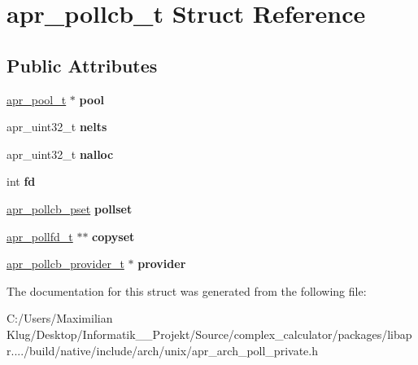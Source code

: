 \hypertarget{structapr__pollcb__t}{}\section{apr\+\_\+pollcb\+\_\+t Struct Reference}
\label{structapr__pollcb__t}
\subsection*{Public Attributes}
\begin{DoxyCompactItemize}
\item 
\mbox{\label{structapr__pollcb__t_a6d9b05e3797933c5e537312fe772b6a8}} 
\mbox{\hyperlink{group__apr__pools_gaf137f28edcf9a086cd6bc36c20d7cdfb}{apr\+\_\+pool\+\_\+t}} $\ast$ {\bfseries pool}
\item 
\mbox{\label{structapr__pollcb__t_ab6ba300bcd03fb92a16163b866bd5b5e}} 
apr\+\_\+uint32\+\_\+t {\bfseries nelts}
\item 
\mbox{\label{structapr__pollcb__t_a6b43d3034680d3227eadad8569837c2e}} 
apr\+\_\+uint32\+\_\+t {\bfseries nalloc}
\item 
\mbox{\label{structapr__pollcb__t_a109b84513925368dd7f1b1fb1653c198}} 
int {\bfseries fd}
\item 
\mbox{\label{structapr__pollcb__t_a4334b3d1e7a4b9acbb633d3575ae389d}} 
\mbox{\hyperlink{unionapr__pollcb__pset}{apr\+\_\+pollcb\+\_\+pset}} {\bfseries pollset}
\item 
\mbox{\label{structapr__pollcb__t_ae057ae42284f10a37470369b36815e06}} 
\mbox{\hyperlink{structapr__pollfd__t}{apr\+\_\+pollfd\+\_\+t}} $\ast$$\ast$ {\bfseries copyset}
\item 
\mbox{\label{structapr__pollcb__t_abf254cccefa7e8cf4b3503c90265fd3d}} 
\mbox{\hyperlink{structapr__pollcb__provider__t}{apr\+\_\+pollcb\+\_\+provider\+\_\+t}} $\ast$ {\bfseries provider}
\end{DoxyCompactItemize}


The documentation for this struct was generated from the following file\+:\begin{DoxyCompactItemize}
\item 
C\+:/\+Users/\+Maximilian Klug/\+Desktop/\+Informatik\+\_\+\_\+\+Projekt/\+Source/complex\+\_\+calculator/packages/libapr..../build/native/include/arch/unix/apr\+\_\+arch\+\_\+poll\+\_\+private.\+h\end{DoxyCompactItemize}
